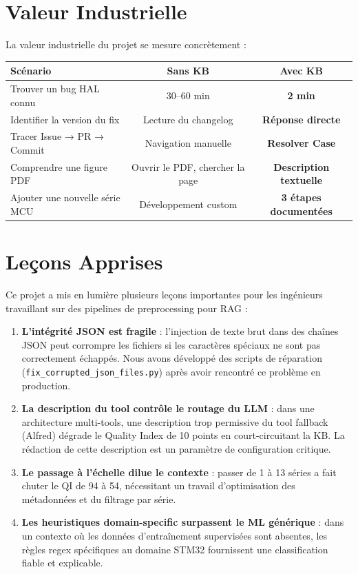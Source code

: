 \documentclass[12pt,a4paper]{report}
\begin{document}
\section{Valeur Industrielle}

La valeur industrielle du projet se mesure concrètement :

\begin{longtable}{p{5cm}cc}
\toprule
\textbf{Scénario} & \textbf{Sans KB} & \textbf{Avec KB} \\
\midrule
Trouver un bug HAL connu & 30--60 min & \textbf{2 min} \\
Identifier la version du fix & Lecture du changelog & \textbf{Réponse directe} \\
Tracer Issue → PR → Commit & Navigation manuelle & \textbf{Resolver Case} \\
Comprendre une figure PDF & Ouvrir le PDF, chercher la page & \textbf{Description textuelle} \\
Ajouter une nouvelle série MCU & Développement custom & \textbf{3 étapes documentées} \\
\bottomrule
\end{longtable}

\section{Leçons Apprises}

Ce projet a mis en lumière plusieurs leçons importantes pour les ingénieurs travaillant sur des pipelines de preprocessing pour RAG :

\begin{enumerate}
  \item \textbf{L'intégrité JSON est fragile} : l'injection de texte brut dans des chaînes JSON peut corrompre les fichiers si les caractères spéciaux ne sont pas correctement échappés. Nous avons développé des scripts de réparation (\texttt{fix\_corrupted\_json\_files.py}) après avoir rencontré ce problème en production.
  
  \item \textbf{La description du tool contrôle le routage du LLM} : dans une architecture multi-tools, une description trop permissive du tool fallback (Alfred) dégrade le Quality Index de 10 points en court-circuitant la KB. La rédaction de cette description est un paramètre de configuration critique.
  
  \item \textbf{Le passage à l'échelle dilue le contexte} : passer de 1 à 13 séries a fait chuter le QI de 94 à 54, nécessitant un travail d'optimisation des métadonnées et du filtrage par série.
  
  \item \textbf{Les heuristiques domain-specific surpassent le ML générique} : dans un contexte où les données d'entraînement supervisées sont absentes, les règles regex spécifiques au domaine STM32 fournissent une classification fiable et explicable.
\end{enumerate}
\end{document}
